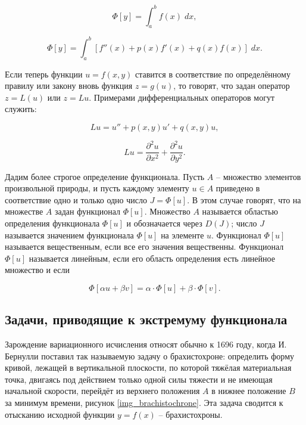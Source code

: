 \documentclass{article}
\begin{document}
\begin{displaymath}
	\Phi[y] = \int_{a}^{b} f(x) \; dx,
\end{displaymath}

\begin{displaymath}
	\Phi[y] = \int_{a}^{b} [f''(x) + p(x)f'(x) + q(x)f(x)] \;  dx.
\end{displaymath}

Если теперь функции $u = f(x, y)$ ставится в соответствие по определённому правилу или закону вновь функция $z = g(u)$, то говорят, что задан оператор $z = L(u)$ или $z = Lu$. Примерами дифференциальных операторов могут служить:

\begin{displaymath}
	Lu = u'' + p(x,y)u' + q(x,y)u,
\end{displaymath}

\begin{displaymath}
    Lu = \frac{\partial^2 u}{\partial x^2} + \frac{\partial^2 u}{\partial y^2}.
\end{displaymath}

Дадим более строгое определение функционала. Пусть $A$ – множество элементов произвольной природы, и пусть каждому элементу $u \in A$ приведено в соответствие одно и только одно число $J = \Phi[u]$. В этом случае говорят, что на множестве $A$ задан функционал $\Phi[u]$. Множество $A$ называется областью определения функционала $\Phi[u]$ и обозначается через $D(J)$; число $J$ называется значением функционала $\Phi[u]$ на элементе $u$. Функционал $\Phi[u]$ называется вещественным, если все его значения вещественны. Функционал $\Phi[u]$ называется линейным, если его область определения есть линейное множество и если

\begin{displaymath}
    \Phi[\alpha u + \beta v] = \alpha \cdot \Phi[u] + \beta \cdot \Phi[v].
\end{displaymath}


\subsection{Задачи, приводящие к экстремуму функционала}

Зарождение вариационного исчисления относят обычно к 1696 году, когда И. Бернулли поставил так называемую задачу о брахистохроне: определить форму кривой, лежащей в вертикальной плоскости, по которой тяжёлая материальная точка, двигаясь под действием только одной силы тяжести и не имеющая начальной скорости, перейдёт из верхнего положения $A$ в нижнее положение $B$ за минимум времени, рисунок \ref{img_brachistochrone}. Эта задача сводится к отысканию исходной функции $y = f(x)$ – брахистохроны.
\end{document}
